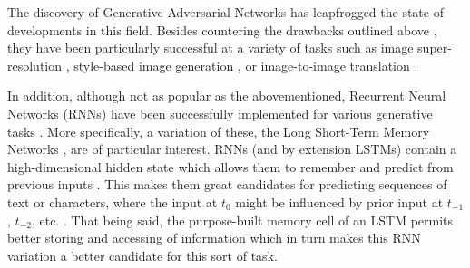 \documentclass[a4paper]{book}
\begin{document}
The discovery of Generative Adversarial Networks \parencite[GANs;][]{goodfellow_generative_2014} has leapfrogged the state of developments in this field. Besides countering the drawbacks outlined above \parencite{goodfellow_nips_2016}, they have been particularly successful at a variety of tasks such as image super-resolution \parencite[; see Figure \ref{fig:srgan}]{ledig_photo-realistic_2016}, style-based image generation \parencite{karras_style-based_2018}, or image-to-image translation \parencite[such as converting a satellite image into a map, or a sketch into a photorealistic image;][;see Figure \ref{fig:pix2pix}]{isola_image--image_2016}.

In addition, although not as popular as the abovementioned, Recurrent Neural Networks (RNNs) have been successfully implemented for various generative tasks \parencite{jenal_rnn-based_2019, ICML2011Sutskever_524}. More specifically, a variation of these, the Long Short-Term Memory Networks \parencite[LSTMs;][]{hochreiter_long_1997}, are of particular interest. RNNs (and by extension LSTMs) contain a high-dimensional hidden state which allows them to remember and predict from previous inputs \parencite{ICML2011Sutskever_524}. This makes them great candidates for predicting sequences \parencite{graves_generating_2013} of text or characters, where the input at $t_0$ might be influenced by prior input at $t_{-1}$, $t_{-2}$, etc. \parencite{fan_tts_2014}. That being said, the purpose-built memory cell of an LSTM permits better storing and accessing of information \parencite{hochreiter_long_1997, graves_generating_2013} which in turn makes this RNN variation a better candidate for this sort of task.
\end{document}
